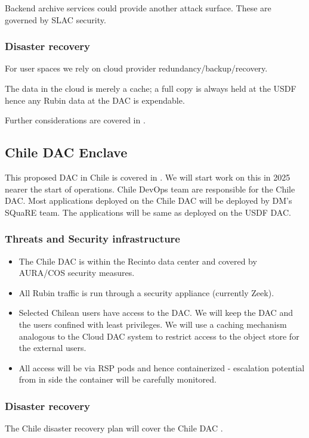 Backend archive services could provide another attack surface.
These are governed by \gls{SLAC} security.

\subsubsection{Disaster recovery}
For user  spaces we rely on \gls{cloud} provider redundancy/backup/recovery.

The data in the cloud is merely a cache; a full copy is always held at the \gls{USDF} hence any Rubin data at the \gls{DAC} is expendable.

Further considerations are covered in .

\subsection{ Chile \gls{DAC} Enclave}
This proposed \gls{DAC} in Chile is covered in \cite{LDM-572}.
We will  start work on this in 2025 nearer the start of operations.
Chile DevOps team are responsible for the Chile \gls{DAC}.
Most applications deployed on the Chile DAC will be deployed by DM's \gls{SQuaRE} team.
The applications will be same as deployed on the USDF \gls{DAC}.

\subsubsection{ Threats and Security infrastructure}

\begin{itemize}
\item The Chile DAC is within the Recinto data center and covered by \gls{AURA}/COS security measures.\item All Rubin traffic is run through a security appliance (currently Zeek).
\item Selected Chilean users have access to the \gls{DAC}. We will keep the \gls{DAC} and the users confined with least privileges. We will use a caching mechanism analogous to the Cloud \gls{DAC} system to restrict access to the object store for the external users.
\item All access will be via \gls{RSP} pods and hence containerized - escalation potential from in side the container will be carefully monitored.
\end{itemize}
\subsubsection{Disaster recovery}
The Chile disaster recovery plan will cover the Chile \gls{DAC} .



